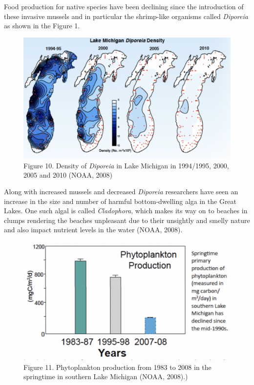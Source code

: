 \documentclass[
]{book}
\begin{document}
Food production for native species have been declining since the introduction of these invasive mussels and in particular the shrimp-like organisms called \emph{Diporeia} as shown in the Figure 1.

\begin{figure}
\centering
\includegraphics{images/figure10.png}
\caption{Figure 10. Density of \emph{Diporeia} in Lake Michigan in 1994/1995, 2000, 2005 and 2010 (NOAA, 2008)}
\end{figure}

Along with increased mussels and decreased \emph{Diporeia} researchers have seen an increase in the size and number of harmful bottom-dwelling alga in the Great Lakes. One such algal is called \emph{Cladophora}, which makes its way on to beaches in clumps rendering the beaches unpleasant due to their unsightly and smelly nature and also impact nutrient levels in the water (NOAA, 2008).

\begin{figure}
\centering
\includegraphics{images/figure11.png}
\caption{Figure 11. Phytoplankton production from 1983 to 2008 in the springtime in southern Lake Michigan (NOAA, 2008).)}
\end{figure}
\end{document}
